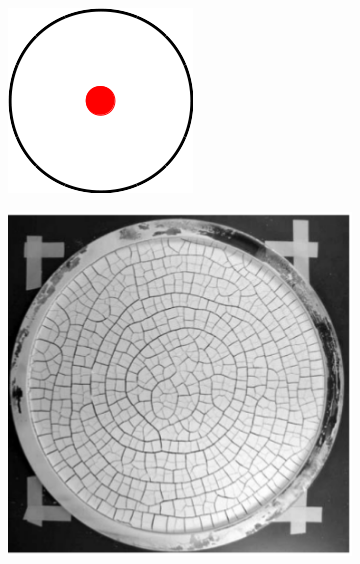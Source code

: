 \begin{figure}[htb!]
  \begin{subfigure}{0.14\textwidth}
    \includegraphics[width=\textwidth]{Chapter4/figures/2D/ring_schematic.png}
    \caption{}
  \end{subfigure}
  \hspace{0.02\textwidth}
  \begin{subfigure}{0.14\textwidth}
    \includegraphics[width=\textwidth]{Chapter4/figures/2D/paste_ring.png}

\end{subfigure}
\end{figure}
